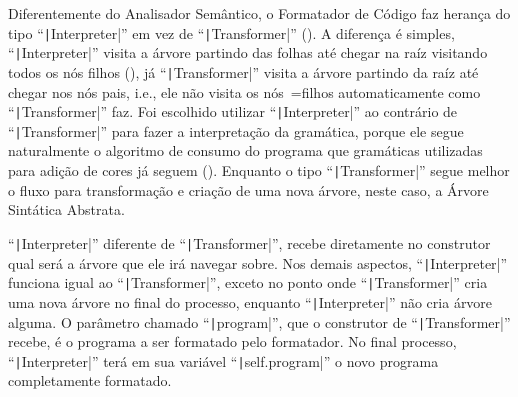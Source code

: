 Diferentemente do Analisador Semântico,
o Formatador de Código faz herança do tipo ``\texttt|Interpreter|'' em vez de ``\texttt|Transformer|'' ().
A diferença é simples,
``\texttt|Interpreter|'' visita a árvore partindo das folhas até chegar na raíz visitando todos os nós filhos (),
já ``\texttt|Transformer|'' visita a árvore partindo da raíz até chegar nos nós pais,
i.e.,
ele não visita os nós~=filhos automaticamente como ``\texttt|Transformer|'' faz.
Foi escolhido utilizar ``\texttt|Interpreter|'' ao contrário de ``\texttt|Transformer|'' para fazer a interpretação da gramática,
porque ele segue naturalmente o algoritmo de consumo do programa que gramáticas utilizadas para adição de cores já seguem ().
Enquanto o tipo ``\texttt|Transformer|'' segue melhor o fluxo para transformação e
criação de uma nova árvore,
neste caso,
a Árvore Sintática Abstrata.

``\texttt|Interpreter|'' diferente de ``\texttt|Transformer|'',
recebe diretamente no construtor qual será a árvore que ele irá navegar sobre.
Nos demais aspectos,
``\texttt|Interpreter|'' funciona igual ao ``\texttt|Transformer|'',
exceto no ponto onde ``\texttt|Transformer|'' cria uma nova árvore no final do processo,
enquanto ``\texttt|Interpreter|'' não cria árvore alguma.
O parâmetro chamado ``\texttt|program|'',
que o construtor de ``\texttt|Transformer|'' recebe,
é o programa a ser formatado pelo formatador.
No final processo,
``\texttt|Interpreter|'' terá em sua variável ``\texttt|self.program|'' o novo programa completamente formatado.

